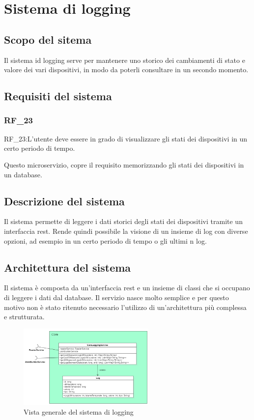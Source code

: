 \chapter{Sistema di logging}\label{cap:microservizio-logging}

\section{Scopo del sitema}

Il sistema id logging serve per mantenere uno storico dei cambiamenti di stato e valore dei vari dispositivi, in modo da poterli consultare in un secondo momento. 

\section{Requisiti del sistema}

\subsection{RF\_23}

RF\_23:L'utente deve essere in grado di visualizzare gli stati dei dispositivi in un certo periodo di tempo.

Questo microservizio, copre il requisito memorizzando gli stati dei dispositivi in un database.

\section{Descrizione del sistema}
Il sistema permette di leggere i dati storici degli stati dei dispositivi tramite un interfaccia rest. Rende quindi possibile la visione di un insieme di log con diverse opzioni, ad esempio in un certo periodo di tempo o gli ultimi n log.

\section{Architettura del sistema}

Il sistema è composta da un'interfaccia rest e un insieme di classi che si occupano di leggere i dati dal database.
Il servizio nasce molto semplice e per questo motivo non è stato ritenuto necessario l'utilizzo di un'architettura più complessa e strutturata.

\begin{figure}[ht]
    \centering
    \includegraphics[width=0.6\textwidth]{img/classi_logging.png}
    \caption{Vista generale del sistema di logging}
    \label{fig:general_logging}
\end{figure}

